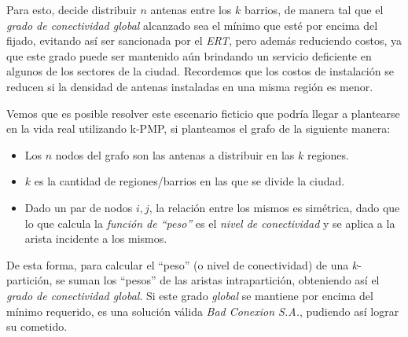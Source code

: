 Para esto, decide distribuir $n$ antenas entre los $k$ barrios, de manera tal que el \textit{grado de conectividad global} alcanzado sea el mínimo que esté por encima del fijado, evitando así ser sancionada por el \textit{ERT}, pero además reduciendo costos, ya que este grado puede ser mantenido aún brindando un servicio deficiente en algunos de los sectores de la ciudad. Recordemos que los costos de instalación se reducen si la densidad de antenas instaladas en una misma región es menor.

Vemos que es posible resolver este escenario ficticio que podría llegar a plantearse en la vida real utilizando k-PMP, si planteamos el grafo de la siguiente manera:

\begin{itemize}
\item Los $n$ nodos del grafo son las antenas a distribuir en las $k$ regiones.

\item $k$ es la cantidad de regiones/barrios en las que se divide la ciudad.

\item Dado un par de nodos $i, j$, la relación entre los mismos es simétrica, dado que lo que calcula la \textit{función de ``peso''} es el \textit{nivel de conectividad} y se aplica a la arista incidente a los mismos.
\end{itemize}

De esta forma, para calcular el ``peso'' (o nivel de conectividad) de una $k$-partición, se suman los ``pesos'' de las aristas intrapartición, obteniendo así el \textit{grado de conectividad global}. Si este grado \textit{global} se mantiene por encima del mínimo requerido, es una solución válida \textit{Bad Conexion S.A.}, pudiendo así lograr su cometido.
